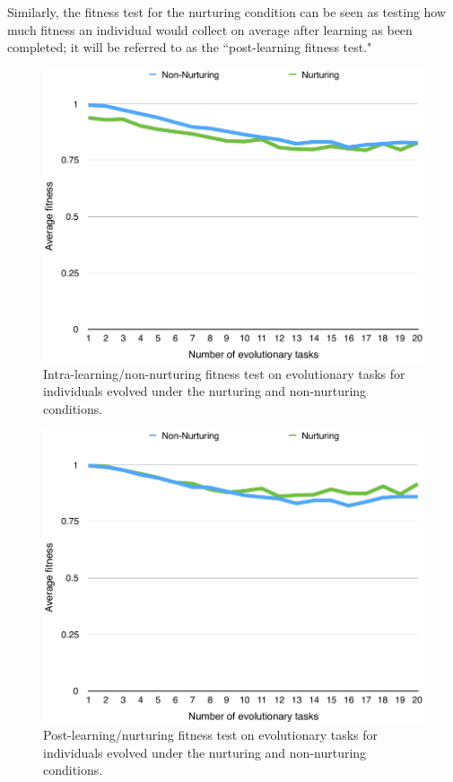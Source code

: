 \documentclass[master]{outhesis}
\begin{document}
Similarly, the fitness test for the nurturing condition can be seen as testing how much fitness an individual would collect on average after learning as been completed;
it will be referred to as the ``post-learning fitness test."

\begin{figure}[H]
	\centering
	\includegraphics{NonNurturingFitnessTestPlot.pdf}
	\caption{Intra-learning/non-nurturing fitness test on evolutionary tasks for individuals evolved under the nurturing and non-nurturing conditions.}
\end{figure}

\begin{figure}[H]
	\centering
	\includegraphics{NurturingFitnessTestPlot.pdf}
	\caption{Post-learning/nurturing fitness test on evolutionary tasks for individuals evolved under the nurturing and non-nurturing conditions.}
\end{figure}
\end{document}
